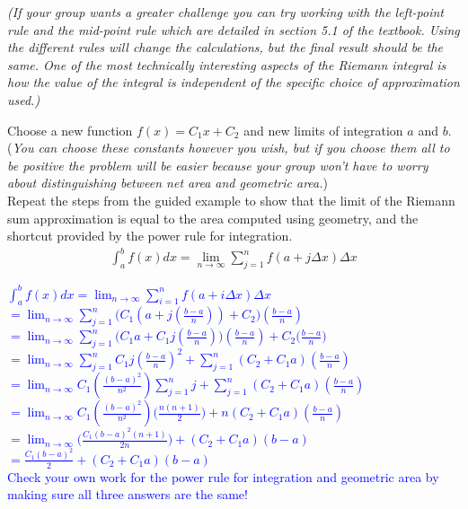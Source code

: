 \documentclass{ximera}
\begin{document}
\begin{exercise}
\begin{enumerate}
        \textit{(If your group wants a greater challenge you can try working with the left-point rule and the mid-point rule which are detailed in section 5.1 of the textbook. Using the different rules will change the calculations, but the final result should be the same. One of the most technically interesting aspects of the Riemann integral is how the value of the integral is independent of the specific choice of approximation used.)}
    \end{enumerate}
\end{exercise}

\begin{exercise}    
    Choose a new function $f(x) = C_{1}x + C_{2}$ and new limits of integration $a$ and $b$. (\textit{You can choose these constants however you wish, but if you choose them all to be positive the problem will be easier because your group won't have to worry about distinguishing between net area and geometric area.})\\

    Repeat the steps from the guided example to show that the limit of the Riemann sum approximation is equal to the area computed using geometry, and the shortcut provided by the power rule for integration.\\

\begin{align}
	\int_{a}^b f(x) dx = \lim_{n\rightarrow \infty} \sum_{j=1}^n f(a + j\Delta x) \Delta x \nonumber
\end{align}

\textcolor{blue}{$\displaystyle\int_{a}^b f(x) dx = \lim_{n\rightarrow \infty} \sum_{i=1}^n f(a + i\Delta x) \Delta x$\\
$\displaystyle=\lim_{n\rightarrow \infty} \sum_{j=1}^n \big(C_1(a+j(\frac{b-a}{n}))+C_2\big)(\frac{b-a}{n})$\\
$\displaystyle =\lim_{n\rightarrow \infty} \sum_{j=1}^n \big(C_1a+C_1j(\frac{b-a}{n})\big)(\frac{b-a}{n})+C_2\big(\frac{b-a}{n})$\\
$\displaystyle=\lim_{n\rightarrow \infty} \sum_{j=1}^n C_1j(\frac{b-a}{n})^2+\sum_{j=1}^n(C_2+C_1a)(\frac{b-a}{n})$\\
$\displaystyle=\lim_{n\rightarrow \infty} C_1(\frac{(b-a)^2}{n^2})\sum_{j=1}^n j+\sum_{j=1}^n(C_2+C_1a)(\frac{b-a}{n})$\\
$\displaystyle=\lim_{n\rightarrow \infty} C_1(\frac{(b-a)^2}{n^2})\bigg(\frac{n(n+1)}{2}\bigg)+n(C_2+C_1a)(\frac{b-a}{n})$\\
$\displaystyle=\lim_{n\rightarrow \infty} \bigg(\frac{C_1(b-a)^2(n+1)}{2n}\bigg)+(C_2+C_1a)(b-a)$\\
$\displaystyle =\frac{C_1(b-a)^2}{2}+(C_2+C_1a)(b-a)$\\
Check your own work for the power rule for integration and geometric area by making sure all three answers are the same!}
\end{exercise}
\end{document}
